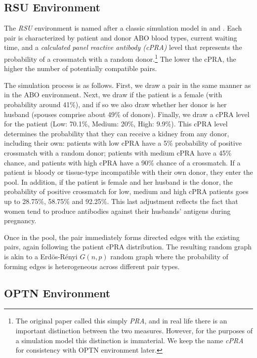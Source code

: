 \subsection{RSU Environment}

The \emph{RSU} environment is named after a classic simulation model in \citet*{roth2007efficient} and \cite{saidman2006increasing}. Each pair is characterized by patient and donor ABO blood types, current waiting time, and a \emph{calculated panel reactive antibody (cPRA)} level that represents the probability of a crossmatch with a random donor.\footnote{The original \citet{roth2007efficient} paper called this simply \emph{PRA}, and in real life there is an important distinction between the two measures. However, for the purposes of a simulation model this distinction is immaterial. We keep the name \emph{cPRA} for consistency with OPTN environment later.} The lower the cPRA, the higher the number of potentially compatible pairs.

The simulation process is as follows. First, we draw a pair in the same manner as in the ABO environment. Next, we draw if the patient is a female (with probability around 41\%), and if so we also draw whether her donor is her husband (spouses comprise about 49\% of donors). Finally, we draw a  cPRA level for the patient (Low: 70.1\%, Medium: 20\%, High: 9.9\%). This cPRA level determines the probability that they can receive a kidney from any donor, including their own: patients with low cPRA have a 5\% probability of positive crossmatch with a random donor; patients with medium cPRA have a 45\% chance, and patients with high cPRA have a 90\% chance of a crossmatch. If a patient is bloody or tissue-type incompatible with their own donor, they enter the pool. In addition, if the patient is female and her husband is the donor, the probability of positive crossmatch for low, medium and high cPRA patients goes up to 28.75\%, 58.75\% and 92.25\%. This last adjustment reflects the fact that women tend to produce antibodies against their husbands' antigens during pregnancy.

Once in the pool, the pair immediately forms directed edges with the existing pairs, again following the patient cPRA distribution. The resulting random graph is akin to a Erd\"{o}s-R\'{e}nyi $G(n,p)$ random graph where the probability of forming edges is heterogeneous across different pair types.

\subsection{OPTN Environment}

